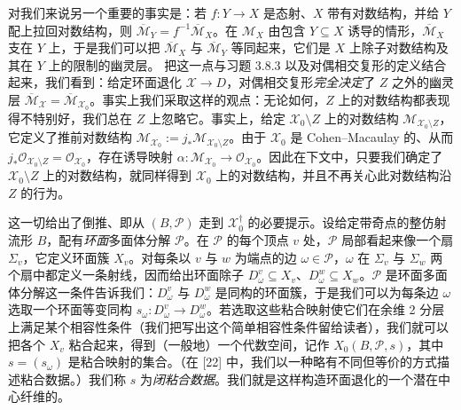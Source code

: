 对我们来说另一个重要的事实是：若 $f:Y\to X$ 是态射、$X$ 带有对数结构，并给 $Y$ 配上拉回对数结构，则 $\overline{\mathcal M}_Y=f^{-1}\overline{\mathcal M}_X$。在 $\mathcal M_X$ 由包含 $Y\subseteq X$ 诱导的情形，$\overline{\mathcal M}_X$ 支在 $Y$ 上，于是我们可以把 $\overline{\mathcal M}_X$ 与 $\overline{\mathcal M}_Y$ 等同起来，它们是 $X$ 上除子对数结构及其在 $Y$ 上的限制的幽灵层。
把这一点与习题 3.8.3 以及对偶相交复形的定义结合起来，我们看到：给定环面退化 $\mathcal X\to D$，对偶相交复形\emph{完全决定}了 $Z$ 之外的幽灵层 $\overline{\mathcal M}_{\mathcal X}=\overline{\mathcal M}_{\mathcal X_0}$。事实上我们采取这样的观点：无论如何，$Z$ 上的对数结构都表现得不特别好，我们总在 $Z$ 上忽略它。事实上，给定 $\mathcal X_0\setminus Z$ 上的对数结构 $\mathcal M_{\mathcal X_0\setminus Z}$，它定义了推前对数结构 $\mathcal M_{\mathcal X_0}:=j_*\mathcal M_{\mathcal X_0\setminus Z}$。由于 $\mathcal X_0$ 是 Cohen--Macaulay 的、从而 $j_*\mathcal O_{\mathcal X_0\setminus Z}=\mathcal O_{\mathcal X_0}$，存在诱导映射 $\alpha:\mathcal M_{\mathcal X_0}\to\mathcal O_{\mathcal X_0}$。因此在下文中，只要我们确定了 $\mathcal X_0\setminus Z$ 上的对数结构，就同样得到 $\mathcal X_0$ 上的对数结构，并且不再关心此对数结构沿 $Z$ 的行为。

这一切给出了倒推、即从 $(B,\mathcal P)$ 走到 $\mathcal X_0^\dagger$ 的必要提示。设给定带奇点的整仿射流形 $B$，配有\emph{环面}多面体分解 $\mathcal P$。在 $\mathcal P$ 的每个顶点 $v$ 处，$\mathcal P$ 局部看起来像一个扇 $\Sigma_v$，它定义环面簇 $X_v$。对每条以 $v$ 与 $w$ 为端点的边 $\omega\in\mathcal P$，$\omega$ 在 $\Sigma_v$ 与 $\Sigma_w$ 两个扇中都定义一条射线，因而给出环面除子 $D_\omega^v\subseteq X_v$、$D_\omega^w\subseteq X_w$。$\mathcal P$ 是环面多面体分解这一条件告诉我们：$D_\omega^v$ 与 $D_\omega^w$ 是同构的环面簇，于是我们可以为每条边 $\omega$ 选取一个环面等变同构 $s_\omega:D_\omega^v\to D_\omega^w$。若选取这些粘合映射使它们在余维 2 分层上满足某个相容性条件（我们把写出这个简单相容性条件留给读者），我们就可以把各个 $X_v$ 粘合起来，得到（一般地）一个代数空间，记作 $X_0(B,\mathcal P,s)$，其中 $s=(s_\omega)$ 是粘合映射的集合。（在 [22] 中，我们以一种略有不同但等价的方式描述粘合数据。）我们称 $s$ 为\emph{闭粘合数据}。我们就是这样构造环面退化的一个潜在中心纤维的。

